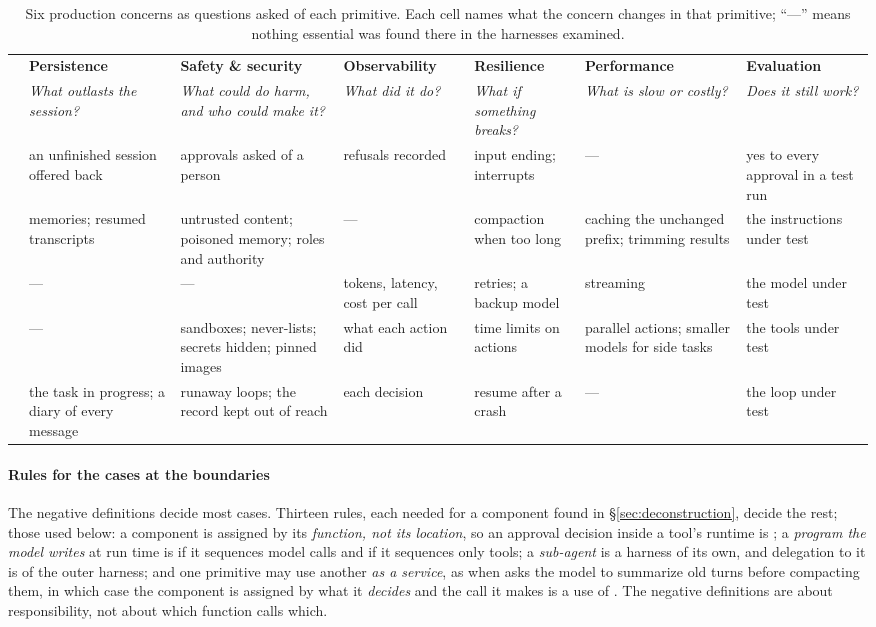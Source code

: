 \begin{table}[t]
\centering
\scriptsize
\setlength{\tabcolsep}{3pt}
\caption{Six production concerns as questions asked of each primitive. Each cell names what the concern changes in that primitive; ``---'' means nothing essential was found there in the harnesses examined.}
\label{tab:concerns}
\begin{tabularx}{\textwidth}{@{}l*{6}{Y}@{}}
\toprule
& \textbf{Persistence} & \textbf{Safety \& security} & \textbf{Observability} & \textbf{Resilience} & \textbf{Performance} & \textbf{Evaluation} \\
& \emph{What outlasts the session?} & \emph{What could do harm, and who could make it?} & \emph{What did it do?} & \emph{What if something breaks?} & \emph{What is slow or costly?} & \emph{Does it still work?} \\
\midrule
{} & an unfinished session offered back & approvals asked of a person & refusals recorded & input ending; interrupts & --- & yes to every approval in a test run \\
 & memories; resumed transcripts & untrusted content; poisoned memory; roles and authority & --- & compaction when too long & caching the unchanged prefix; trimming results & the instructions under test \\
 & --- & --- & tokens, latency, cost per call & retries; a backup model & streaming & the model under test \\
 & --- & sandboxes; never-lists; secrets hidden; pinned images & what each action did & time limits on actions & parallel actions; smaller models for side tasks & the tools under test \\
 & the task in progress; a diary of every message & runaway loops; the record kept out of reach & each decision & resume after a crash & --- & the loop under test \\
\bottomrule
\end{tabularx}
\end{table}

\paragraph{Rules for the cases at the boundaries}
\label{sec:rules}
The negative definitions decide most cases. Thirteen rules, each needed for a component found in \S\ref{sec:deconstruction}, decide the rest; those used below: a component is assigned by its \emph{function, not its location}, so an approval decision inside a tool's runtime is ; a \emph{program the model writes} at run time is  if it sequences model calls and  if it sequences only tools; a \emph{sub-agent} is a harness of its own, and delegation to it is  of the outer harness; and one primitive may use another \emph{as a service}, as when  asks the model to summarize old turns before compacting them, in which case the component is assigned by what it \emph{decides} and the call it makes is a use of . The negative definitions are about responsibility, not about which function calls which.
